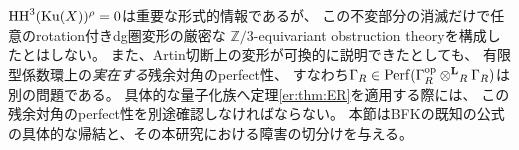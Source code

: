 \begin{remark}[残余対角との論理的境界]\label{ho:rem:barrier}
$\operatorname{HH}^3(\operatorname{Ku}(X))^\rho=0$は重要な形式的情報であるが、
この不変部分の消滅だけで任意のrotation付きdg圏変形の厳密な
$\mathbb Z/3$-equivariant obstruction theoryを構成したとはしない。
また、Artin切断上の変形が可換的に説明できたとしても、
有限型係数環上の\emph{実在する}残余対角のperfect性、
すなわち$\Gamma_R\in\operatorname{Perf}(\Gamma_R^{\mathrm{op}}\mathbin{\otimes^{\mathbf L}}_R\Gamma_R)$は別の問題である。
具体的な量子化族へ定理\ref{er:thm:ER}を適用する際には、
この残余対角のperfect性を別途確認しなければならない。
本節はBFKの既知の公式の具体的な帰結と、その本研究における障害の切分けを与える。
\end{remark}
